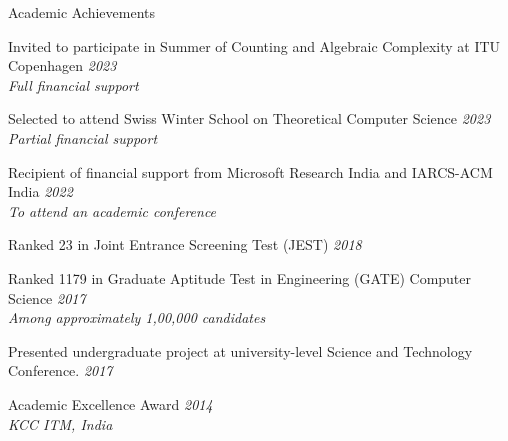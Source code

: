 \documentclass{resume} %
\begin{document}
\begin{rSection}{Academic Achievements}
    \item Invited to participate in Summer of Counting and Algebraic Complexity at ITU Copenhagen \hfill {\em 2023}
    \\ {\em Full financial support}
    \item Selected to attend Swiss Winter School on Theoretical Computer Science \hfill {\em 2023}
    \\ {\em Partial financial support}
    \item Recipient of financial support from Microsoft Research India and IARCS-ACM India \hfill {\em 2022}
    \\ {\em To attend an academic conference} 
    \item Ranked 23 in Joint Entrance Screening Test (JEST) \hfill {\em 2018}
    \item Ranked 1179 in Graduate Aptitude Test in Engineering (GATE) Computer Science \hfill {\em 2017} 
    \\ {\em Among approximately 1,00,000 candidates}
    \item Presented undergraduate project at university-level Science and Technology Conference. \hfill {\em 2017}
    \item Academic Excellence Award \hfill {\em 2014} 
    \\ {\em KCC ITM, India}
\end{rSection}

\end{document}

